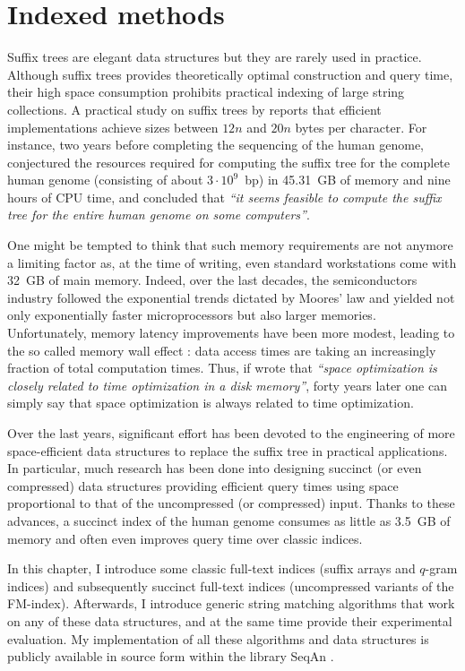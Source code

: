 \chapter{Indexed methods}
\label{chr:index}

Suffix trees are elegant data structures but they are rarely used in practice.
Although suffix trees provides theoretically optimal construction and query time, their high space consumption prohibits practical indexing of large string collections.
A practical study on suffix trees by \cite{Kurtz1999} reports that efficient implementations achieve sizes between $12n$ and $20n$ bytes per character.
For instance, two years before completing the sequencing of the human genome, \citeauthor{Kurtz1999} conjectured the resources required for computing the suffix tree for the complete human genome (consisting of about $3 \cdot 10^9$~bp) in 45.31~GB of memory and nine hours of CPU time, and concluded that \emph{``it seems feasible to compute the suffix tree for the entire human genome on some computers''}.

One might be tempted to think that such memory requirements are not anymore a limiting factor as, at the time of writing, even standard workstations come with 32~GB of main memory.
Indeed, over the last decades, the semiconductors industry followed the exponential trends dictated by Moores' law and yielded not only exponentially faster microprocessors but also larger memories.
Unfortunately, memory latency improvements have been more modest, leading to the so called memory wall effect \citep{Wilkes1995}: data access times are taking an increasingly fraction of total computation times.
Thus, if \cite{Knuth1973} wrote that \emph{``space optimization is closely related to time optimization in a disk memory''}, forty years later one can simply say that space optimization is always related to time optimization.

Over the last years, significant effort has been devoted to the engineering of more space-efficient data structures to replace the suffix tree in practical applications.
In particular, much research has been done into designing succinct (or even compressed) data structures providing efficient query times using space proportional to that of the uncompressed (or compressed) input.
Thanks to these advances, a succinct index of the human genome consumes as little as 3.5~GB of memory and often even improves query time over classic indices.

In this chapter, I introduce some classic full-text indices (suffix arrays and $q$-gram indices) and subsequently succinct full-text indices (uncompressed variants of the FM-index).
Afterwards, I introduce generic string matching algorithms that work on any of these data structures, and at the same time provide their experimental evaluation.
My implementation of all these algorithms and data structures is publicly available in source form within the \CC library SeqAn \citep{Doering2008}.

